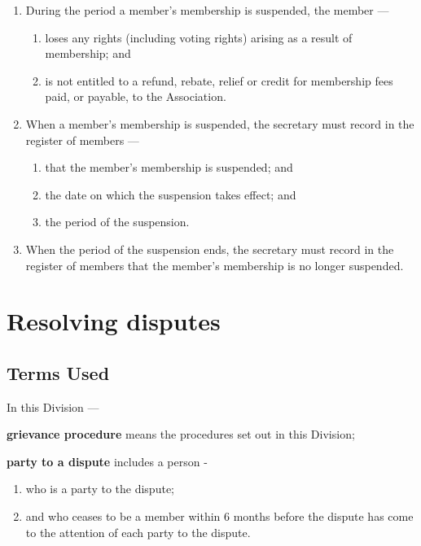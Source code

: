 \documentclass[../constitution.tex]{subfiles}
\begin{document}
\begin{enumerate}

\item During the period a member's membership is suspended, the member ---

  \begin{enumerate}
  
  \item loses any rights (including voting rights) arising as a result of membership; and
  \item is not entitled to a refund, rebate, relief or credit for membership fees paid, or payable, to the Association.
  \end{enumerate}
\item When a member's membership is suspended, the secretary must record in the register of members ---

  \begin{enumerate}
  
  \item that the member's membership is suspended; and
  \item the date on which the suspension takes effect; and
  \item the period of the suspension.
  \end{enumerate}
\item When the period of the suspension ends, the secretary must record in the register of members that the member's membership is no longer suspended.
\end{enumerate}

\hypertarget{division-3-resolving-disputes}{%
\section{Resolving disputes}\label{division-3-resolving-disputes}}

\hypertarget{terms-used}{%
\subsection{Terms Used}\label{terms-used}}

In this Division ---


\textbf{grievance procedure} means the procedures set out in this Division;

\textbf{party to a dispute} includes a person -

\begin{enumerate}
  \def\labelenumi{\alph{enumi})}
  \setcounter{enumi}{0}
  \item who is a party to the dispute;
  \item and who ceases to be a member within 6 months before the dispute has come to the attention of each party to the dispute.
\end{enumerate}
\end{document}
